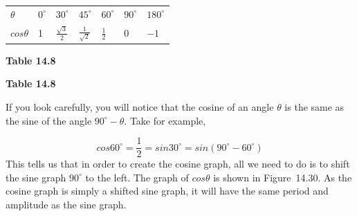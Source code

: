 \begin{table}[H]
\begin{center}
\label{m39414*id86909}
\noindent
{}
\tablelasttail{}
\begin{xtabular}[t]{|l|l|l|l|l|l|l|}\hline
    $\theta $
    &
    ${0}^{\circ }$
    &
    ${30}^{\circ }$
    &
    ${45}^{\circ }$
    &
    ${60}^{\circ }$
    &
    ${90}^{\circ }$
    &
    ${180}^{\circ }$
\tabularnewline{}
    $cos\theta $
    &
1 &
    $\frac{\sqrt{3}}{2}$
    &
    $\frac{1}{\sqrt{2}}$
    &
    $\frac{1}{2}$
    &
0 &
    $-1$
\tabularnewline{}
\end{xtabular}
\end{center}
\begin{center}{\small\bfseries Table 14.8}\end{center}
\begin{caption}{\small\bfseries Table 14.8}\end{caption}
\end{table}
\par
\label{m39414*id87173}If you look carefully, you will notice that the cosine of an angle $\theta $ is the same as the sine of the angle ${90}^{\circ }-\theta $. Take for example,\par 
\label{m39414*id87206}\nopagebreak\noindent{}
\begin{equation}
cos{60}^{\circ }=\frac{1}{2}=sin{30}^{\circ }=sin\left({90}^{\circ }-{60}^{\circ }\right)\tag{14.33}
\end{equation}
\label{m39414*id87280}This tells us that in order to create the cosine graph, all we need to do is to shift the sine graph ${90}^{\circ }$ to the left. The graph of $cos\theta $ is shown in Figure~14.30. As the cosine graph is simply a shifted sine graph, it will have the same period and amplitude as the sine graph.\par 
\setcounter{subfigure}{0}
